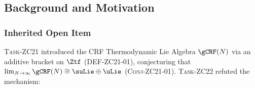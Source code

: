 \documentclass[12pt, a4paper]{article}
\begin{document}
\begin{abstract}
\textsc{Task-ZC22} established that the additive architecture of
\textsc{Def-ZC21-01} produces only zero structure constants
(\textsc{Lem-ZC22-01}), and identified the tensor product mechanism
$(\Zth)^\times \otimes (\Zfi)^\times \hookrightarrow \mathrm{End}(\mathbb{C}^2)\oplus\mathbb{R}$
as the correct path forward (\textsc{Find-ZC22-S01}).

This paper formalises that path.
We define the G-Partition Non-Abelian Chi-Map $\chiNA$ (\textsc{Def-ZC23-01}),
which assigns each $\delta$-event to the $\mathrm{SU}(2)$ channel
with probability $\Gcoup = \ln 2/D_0 \approx 0.7374$,
and introduce the $\fRMS$ structure constant estimator (\textsc{Def-ZC23-02}).
The observable $\fRMS(N)$ converges to the plateau $\sqrt{3}\approx 1.732$
as $N\to\infty$ with power-law exponent $\alpha = 0.001\pm 0.004$
(simulator V22.3, T-canonical gauge).
We register six Phase Misalignments (PM-ZC23-01 through PM-ZC23-06)
as scar tissue, each with an anti-error guard preventing recurrence.
\textsc{Conj-ZC23-01} is thereby placed on firm candidate status,
with one open gap: the formal proof \textsc{Thm-ZC23-01}.
\end{abstract}

\tableofcontents
\newpage

\subsection{Background and Motivation}
\label{zc23:sec:background}

\subsubsection{Inherited Open Item}

\textsc{Task-ZC21} introduced the CRF Thermodynamic Lie Algebra $\gCRF(N)$
via an additive bracket on $\Ztf$ (DEF-ZC21-01), conjecturing that
$\lim_{N\to\infty}\gCRF(N)\cong\suLie\oplus\uLie$ (\textsc{Conj-ZC21-01}).
\textsc{Task-ZC22} refuted the mechanism:
\end{document}

